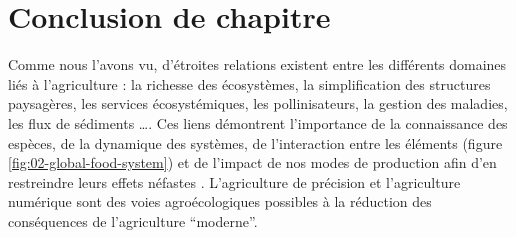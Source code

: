 \documentclass[../thesis.tex]{subfiles}
\begin{document}
    
    
    \newpage
    \section{Conclusion de chapitre}
    
    
    Comme nous l'avons vu, d'étroites relations existent entre les différents domaines liés à l'agriculture \cite{Daineseeaax0121} : la richesse des écosystèmes, la simplification des structures paysagères, les services écosystémiques, les pollinisateurs, la gestion des maladies, les flux de sédiments \dots . Ces liens démontrent l'importance de la connaissance des espèces, de la dynamique des systèmes, de l'interaction entre les éléments (figure \ref{fig:02-global-food-system})  et de l'impact de nos modes de production \cite{nicholson2019setting} afin d'en restreindre leurs effets néfastes \cite{Modica2016}. L'agriculture de précision et l'agriculture numérique sont des voies agroécologiques possibles à la réduction des conséquences de l'agriculture ``moderne''. 
    
\end{document}

